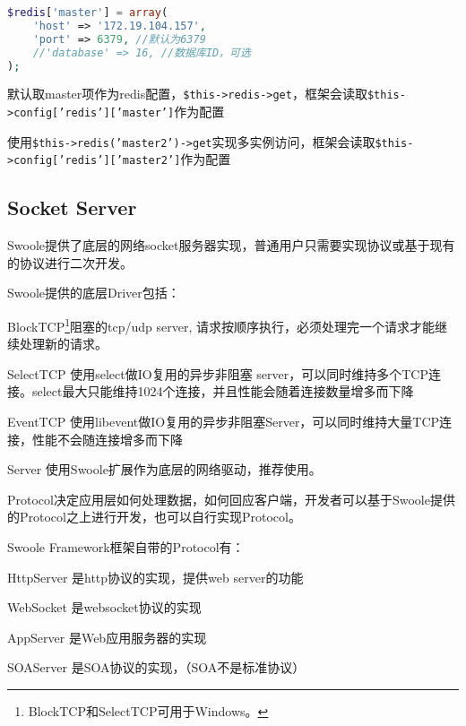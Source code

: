 \begin{lstlisting}[language=PHP]
$redis['master'] = array(
    'host' => '172.19.104.157',
    'port' => 6379, //默认为6379
    //'database' => 16, //数据库ID，可选
);
\end{lstlisting}


\begin{compactitem}
\item 默认取master项作为redis配置，\texttt{\$this->redis->get}，框架会读取\texttt{\$this->config['redis']['master']}作为配置
\item 使用\texttt{\$this->redis('master2')->get}实现多实例访问，框架会读取\texttt{\$this->config['redis']['master2']}作为配置
\end{compactitem}





\subsection{Socket Server}

Swoole提供了底层的网络socket服务器实现，普通用户只需要实现协议或基于现有的协议进行二次开发。

Swoole提供的底层Driver包括：

\begin{compactitem}
\item BlockTCP\footnote{BlockTCP和SelectTCP可用于Windows。}阻塞的tcp/udp server, 请求按顺序执行，必须处理完一个请求才能继续处理新的请求。
\item SelectTCP 使用select做IO复用的异步非阻塞 server，可以同时维持多个TCP连接。select最大只能维持1024个连接，并且性能会随着连接数量增多而下降
\item EventTCP 使用libevent做IO复用的异步非阻塞Server，可以同时维持大量TCP连接，性能不会随连接增多而下降
\item Server 使用Swoole扩展作为底层的网络驱动，推荐使用。
\end{compactitem}


Protocol决定应用层如何处理数据，如何回应客户端，开发者可以基于Swoole提供的Protocol之上进行开发，也可以自行实现Protocol。


Swoole Framework框架自带的Protocol有：

\begin{compactitem}
\item HttpServer 是http协议的实现，提供web server的功能
\item WebSocket 是websocket协议的实现
\item AppServer 是Web应用服务器的实现
\item SOAServer 是SOA协议的实现，（SOA不是标准协议）
\end{compactitem}

